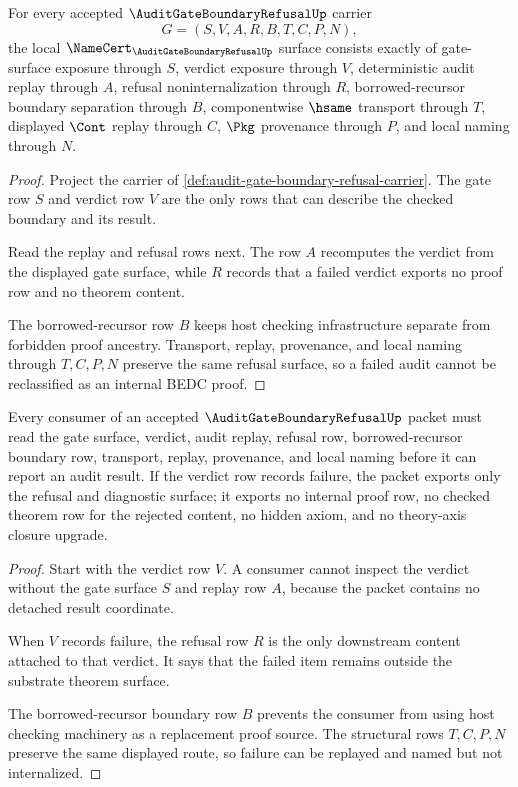 \begin{theorem}
\label{thm:audit-gate-boundary-refusal-namecert-obligations}
For every accepted $\AuditGateBoundaryRefusalUp$ carrier
$$
G=(S,V,A,R,B,T,C,P,N),
$$
the local $\NameCert_{\AuditGateBoundaryRefusalUp}$ surface consists exactly of gate-surface exposure through $S$, verdict exposure through $V$, deterministic audit replay through $A$, refusal noninternalization through $R$, borrowed-recursor boundary separation through $B$, componentwise $\hsame$ transport through $T$, displayed $\Cont$ replay through $C$, $\Pkg$ provenance through $P$, and local naming through $N$.
\end{theorem}
\begin{proof}
Project the carrier of \autoref{def:audit-gate-boundary-refusal-carrier}. The gate row $S$ and verdict row $V$ are the only rows that can describe the checked boundary and its result.

Read the replay and refusal rows next. The row $A$ recomputes the verdict from the displayed gate surface, while $R$ records that a failed verdict exports no proof row and no theorem content.

The borrowed-recursor row $B$ keeps host checking infrastructure separate from forbidden proof ancestry. Transport, replay, provenance, and local naming through $T,C,P,N$ preserve the same refusal surface, so a failed audit cannot be reclassified as an internal BEDC proof.
\end{proof}

\begin{theorem}
\label{thm:audit-gate-boundary-refusal-noninternalization}
Every consumer of an accepted $\AuditGateBoundaryRefusalUp$ packet must read the gate surface, verdict, audit replay, refusal row, borrowed-recursor boundary row, transport, replay, provenance, and local naming before it can report an audit result. If the verdict row records failure, the packet exports only the refusal and diagnostic surface; it exports no internal proof row, no checked theorem row for the rejected content, no hidden axiom, and no theory-axis closure upgrade.
\end{theorem}
\begin{proof}
Start with the verdict row $V$. A consumer cannot inspect the verdict without the gate surface $S$ and replay row $A$, because the packet contains no detached result coordinate.

When $V$ records failure, the refusal row $R$ is the only downstream content attached to that verdict. It says that the failed item remains outside the substrate theorem surface.

The borrowed-recursor boundary row $B$ prevents the consumer from using host checking machinery as a replacement proof source. The structural rows $T,C,P,N$ preserve the same displayed route, so failure can be replayed and named but not internalized.
\end{proof}

